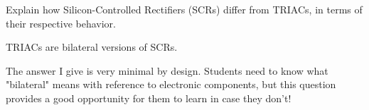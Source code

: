 

Explain how Silicon-Controlled Rectifiers (SCRs) differ from TRIACs, in terms of their respective behavior.







TRIACs are bilateral versions of SCRs.







The answer I give is very minimal by design.  Students need to know what "bilateral" means with reference to electronic components, but this question provides a good opportunity for them to learn in case they don't!




